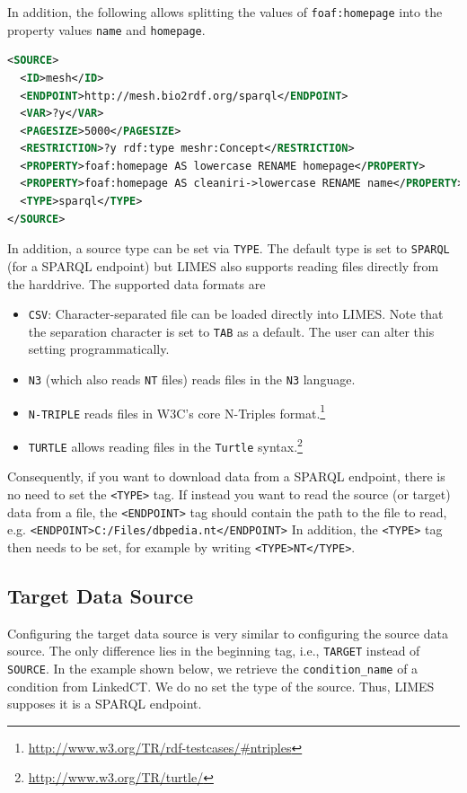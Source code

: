 \documentclass[a4paper, 11pt]{article}
\begin{document}
In addition, the following allows splitting the values of \texttt{foaf:homepage} into the property values \texttt{name} and \texttt{homepage}.

\begin{ttfamily}
\begin{lstlisting}[language=XML,basicstyle=\scriptsize,numberstyle=\tiny]
<SOURCE>
  <ID>mesh</ID>
  <ENDPOINT>http://mesh.bio2rdf.org/sparql</ENDPOINT>
  <VAR>?y</VAR>
  <PAGESIZE>5000</PAGESIZE>
  <RESTRICTION>?y rdf:type meshr:Concept</RESTRICTION>
  <PROPERTY>foaf:homepage AS lowercase RENAME homepage</PROPERTY>
  <PROPERTY>foaf:homepage AS cleaniri->lowercase RENAME name</PROPERTY>
  <TYPE>sparql</TYPE>
</SOURCE>
\end{lstlisting}
\end{ttfamily}

In addition, a source type can be set via \texttt{TYPE}. The default type is set to \texttt{SPARQL} (for a SPARQL endpoint) but LIMES also supports reading files directly from the harddrive. The supported data formats are
\begin{itemize}
\item \texttt{CSV}: Character-separated file can be loaded directly into LIMES. Note that the separation character is set to \texttt{TAB} as a default. The user can alter this setting programmatically.
\item \texttt{N3} (which also reads \texttt{NT} files) reads files in the \texttt{N3} language.
\item \texttt{N-TRIPLE} reads files in W3C's core N-Triples format.\footnote{\url{http://www.w3.org/TR/rdf-testcases/\#ntriples}}
\item  \texttt{TURTLE} allows reading files in the \texttt{Turtle} syntax.\footnote{\url{http://www.w3.org/TR/turtle/}}
\end{itemize}
Consequently, if you want to download data from a SPARQL endpoint, there is no need to set the \texttt{<TYPE>} tag.
If instead you want to read the source (or target) data from a file, the \texttt{<ENDPOINT>} tag should contain the path to the file to read, e.g. \texttt{<ENDPOINT>C:/Files/dbpedia.nt</ENDPOINT>}
In addition, the \texttt{<TYPE>} tag then needs to be set, for example by writing \texttt{<TYPE>NT</TYPE>}.
\subsection{Target Data Source}
Configuring the target data source is very similar to configuring the source data source. The only difference lies in the beginning tag, i.e., \texttt{TARGET} instead of \texttt{SOURCE}. In the example shown below, we retrieve the \texttt{condition\_name} of a condition from LinkedCT. We do no set the type of the source. Thus, LIMES supposes it is a SPARQL endpoint.
\end{document}
